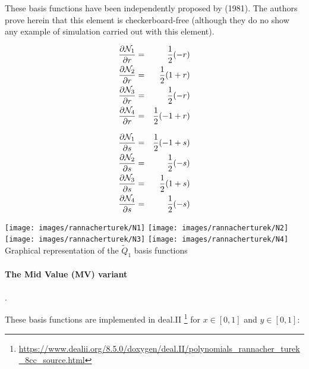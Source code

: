 \begin{remark}
These basis functions have been independently proposed by \textcite{dogm81} (1981). The authors
prove herein that this element is checkerboard-free (although they do no show any example
of simulation carried out with this element).
\end{remark}

\begin{eqnarray}
\frac{\partial {\mathcal{N}}_1}{\partial r} &=& \frac{1}{2}(-r)\\
\frac{\partial {\mathcal{N}}_2}{\partial r} &=& \frac{1}{2}(1+r)\\
\frac{\partial {\mathcal{N}}_3}{\partial r} &=& \frac{1}{2}(-r)\\
\frac{\partial {\mathcal{N}}_4}{\partial r} &=& \frac{1}{2}(-1+r)
\end{eqnarray}

\begin{eqnarray}
\frac{\partial {\mathcal{N}}_1}{\partial s} &=& \frac{1}{2}(-1+s)\\
\frac{\partial {\mathcal{N}}_2}{\partial s} &=& \frac{1}{2}(-s)\\
\frac{\partial {\mathcal{N}}_3}{\partial s} &=& \frac{1}{2}(1+s)\\
\frac{\partial {\mathcal{N}}_4}{\partial s} &=& \frac{1}{2}(-s)
\end{eqnarray}

\begin{center}
\texttt{[image: images/rannacherturek/N1]}
\texttt{[image: images/rannacherturek/N2]}\\
\texttt{[image: images/rannacherturek/N3]}
\texttt{[image: images/rannacherturek/N4]}\\
{\captionfont Graphical representation of the $\tilde{Q}_1$ basis functions}
\end{center}

\paragraph{The Mid Value (MV) variant}. 

These basis functions are implemented in deal.II
\footnote{\url{https://www.dealii.org/8.5.0/doxygen/deal.II/polynomials_rannacher_turek_8cc_source.html}}
for $x\in[0,1]$ and $y\in[0,1]$:

